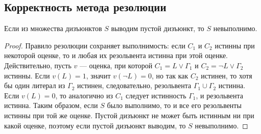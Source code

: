 \documentclass[10pt]{article}
\begin{document}
\subsection{Корректность метода резолюции}
\begin{theorem}
Если из множества дизъюнктов \(S\) выводим пустой дизъюнкт, то \(S\) невыполнимо.
\end{theorem}
\begin{proof}
Правило резолюции сохраняет выполнимость: если \(C_1\) и \(C_2\) истинны при некоторой оценке, то и любая их резольвента истинна при этой оценке. Действительно, пусть \(v\) — оценка, при которой \(C_1 = L \lor \Gamma_1\) и \(C_2 = \neg L \lor \Gamma_2\) истинны. Если \(v(L) = 1\), значит \(v(\neg L) = 0\), но так как \(C_2\) истинен, то хотя бы один литерал из \(\Gamma_2\) истинен, следовательно, резольвента \(\Gamma_1 \cup \Gamma_2\) истинна. Если \(v(L) = 0\), то аналогично из \(C_1\) следует истинность \(\Gamma_1\), и резольвента истинна. Таким образом, если \(S\) было выполнимо, то и все его резольвенты истинны при той же оценке. Пустой дизъюнкт не может быть истинным ни при какой оценке, поэтому если пустой дизъюнкт выводим, то \(S\) невыполнимо.
\end{proof}
\end{document}
